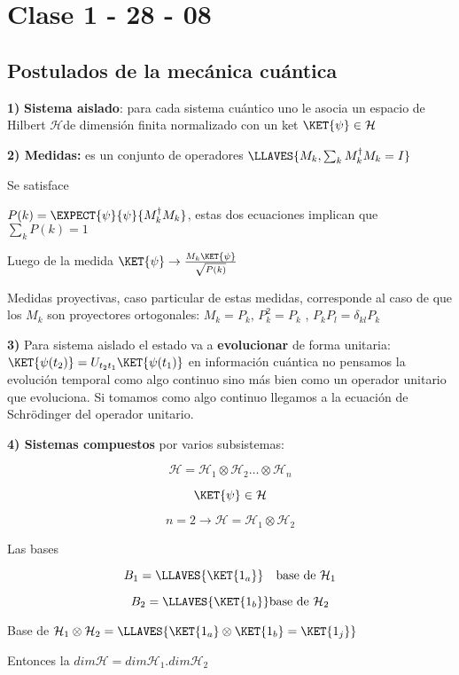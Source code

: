 \chapter{Clase 1 - 28 - 08}

\section{Postulados de la mecánica cuántica}

\textbf{1)} \textbf{Sistema aislado}: para cada sistema cuántico uno
le asocia un espacio de Hilbert $\mathcal{H}$de dimensión finita normalizado
con un ket $\KET{\psi}\in\mathcal{H}$

\textbf{2) Medidas:} es un conjunto de operadores $\LLAVES{M_{k},\sum_{k}M_{k}^{\dagger}M_{k}=I}$

Se satisface

$P(k)=\EXPECT{\psi}{\psi}{M_{k}^{\dagger}M_{k}}$, estas dos ecuaciones implican
que $\sum_{k}P(k)=1$

Luego de la medida $\KET{\psi}\rightarrow\frac{M_{k}\KET{\psi}}{\sqrt{P(k)}}$

Medidas proyectivas, caso particular de estas medidas, corresponde
al caso de que los $M_{k}$ son proyectores ortogonales: $M_{k}=P_{k}$,
$P_{k}^{2}=P_{k}$ , $P_{k}P_{l}=\delta_{kl}P_{k}$

\textbf{3)} Para sistema aislado el estado va a \textbf{evolucionar}
de forma unitaria: $\KET{\psi(t_{2})}=U_{t_{2}t_{1}}\KET{\psi(t_{1})}$
en información cuántica no pensamos la evolución temporal como algo continuo
sino más bien como un operador unitario que evoluciona. Si tomamos
como algo continuo llegamos a la ecuación de Schrödinger del operador
unitario.

\textbf{4) Sistemas compuestos }por varios subsistemas: 

\[
\mathcal{H}=\mathcal{H}_{1}\otimes\mathcal{H}_{2}\dots\otimes\mathcal{H}_{n}
\]

\[
\KET{\psi}\in\mathcal{H}
\]

\[
n=2\rightarrow\mathcal{H}=\mathcal{H}_{1}\otimes\mathcal{H}_{2}
\]

Las bases

\[
B_{1}=\LLAVES{\KET{1_{a}}}\quad\text{base de }\mathcal{H}_{1}
\]

\[
B_{2}=\LLAVES{\KET{1_{b}}}\text{base de }\mathcal{H}_{2}
\]

Base de $\mathcal{H}_{1}\otimes\mathcal{H}_{2}=\LLAVES{\KET{1_{a}}\otimes\KET{1_{b}}=\KET{1_{j}}}$

Entonces la $dim\mathscr{\mathcal{H}}=dim\mathscr{\mathcal{H}}_{1}.dim\mathscr{\mathcal{H}}_{2}$

